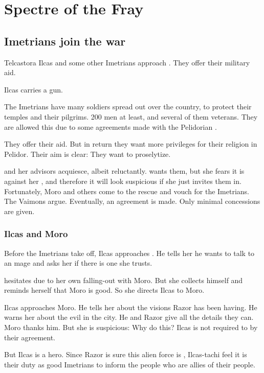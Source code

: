 \section{Spectre of the Fray}








\subsection{Imetrians join the war}
Telcastora Ilcas and some other Imetrians approach \Tiroco. 
They offer their military aid. 

Ilcas carries a gun.

The Imetrians have many soldiers spread out over the country, to protect their temples and their pilgrims. 
200 men at least, and several of them veterans. 
They are allowed this due to some agreements made with the Pelidorian \rayuths. 

They offer their aid. 
But in return they want more privileges for their religion in Pelidor. 
Their aim is clear: They want to proselytize. 

\Tiroco{} and her advisors acquiesce, albeit reluctantly. 
\Tiroco{} wants them, but she fears it is against her , and therefore it will look suspicious if she just invites them in. 
Fortunately, Moro and others come to the rescue and vouch for the Imetrians. 
The Vaimons argue. 
Eventually, an agreement is made. 
Only minimal concessions are given. 





\subsubsection{Ilcas and Moro}
Before the Imetrians take off, Ilcas approaches \Tiroco. 
He tells her he wants to talk to an \Ishrah{} mage and asks her if there is one she trusts. 

\Tiroco{} hesitates due to her own falling-out with Moro. 
But she collects himself and reminds herself that Moro is good. 
So she directs Ilcas to Moro. 

Ilcas approaches Moro. 
He tells her about the visions Razor has been having. 
He warns her about the evil in the city. 
He and Razor give all the details they can. 
Moro thanks him. 
But she is suspicious: Why do this? 
Ilcas is not required to by their agreement. 

But Ilcas is a hero. 
Since Razor is sure this alien force is , Ilcas-tachi feel it is their duty as good Imetrians to inform the people who are allies of their people. 


